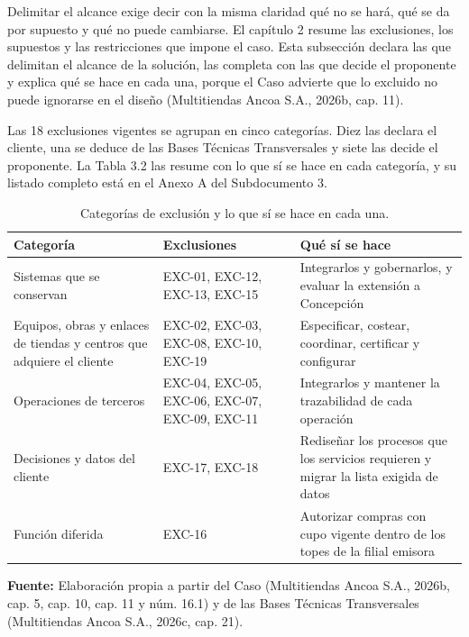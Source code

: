 \documentclass[11pt]{article}
\begin{document}
Delimitar el alcance exige decir con la misma claridad qué no se hará, qué se da por supuesto y qué no puede cambiarse. El capítulo 2 resume las exclusiones, los supuestos y las restricciones que impone el caso. Esta subsección declara las que delimitan el alcance de la solución, las completa con las que decide el proponente y explica qué se hace en cada una, porque el Caso advierte que lo excluido no puede ignorarse en el diseño (Multitiendas Ancoa S.A., 2026b, cap. 11).

Las 18 exclusiones vigentes se agrupan en cinco categorías. Diez las declara el cliente, una se deduce de las Bases Técnicas Transversales y siete las decide el proponente. La Tabla 3.2 las resume con lo que sí se hace en cada categoría, y su listado completo está en el Anexo A del Subdocumento 3.

\begin{longtable}[]{@{}
  >{\raggedright\arraybackslash}p{}
  >{\raggedright\arraybackslash}p{}
  >{\raggedright\arraybackslash}p{}@{}}
\caption{Categorías de exclusión y lo que sí se hace en cada una.}\label{tab:3-2}\\
\toprule\noalign{}
Categoría & Exclusiones & Qué sí se hace \\
\midrule\noalign{}
\endhead
\bottomrule\noalign{}
\endlastfoot
Sistemas que se conservan & EXC-01, EXC-12, EXC-13, EXC-15 & Integrarlos y gobernarlos, y evaluar la extensión a Concepción \\
Equipos, obras y enlaces de tiendas y centros que adquiere el cliente & EXC-02, EXC-03, EXC-08, EXC-10, EXC-19 & Especificar, costear, coordinar, certificar y configurar \\
Operaciones de terceros & EXC-04, EXC-05, EXC-06, EXC-07, EXC-09, EXC-11 & Integrarlos y mantener la trazabilidad de cada operación \\
Decisiones y datos del cliente & EXC-17, EXC-18 & Rediseñar los procesos que los servicios requieren y migrar la lista exigida de datos \\
Función diferida & EXC-16 & Autorizar compras con cupo vigente dentro de los topes de la filial emisora \\
\end{longtable}

{\raggedright\textbf{Fuente:} Elaboración propia a partir del Caso (Multitiendas Ancoa S.A., 2026b, cap. 5, cap. 10, cap. 11 y núm. 16.1) y de las Bases Técnicas Transversales (Multitiendas Ancoa S.A., 2026c, cap. 21).\par}
\end{document}
